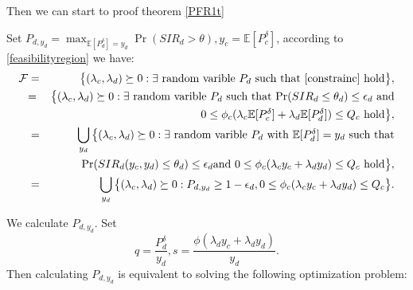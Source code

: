 \documentclass[12pt, draftclsnofoot, journal, letterpaper, onecolumn]{IEEEtran}
\begin{document}
Then we can start to proof theorem \ref{PFR1t}
\begin{IEEEproof}
Set $P_{d,y_d}=\max_{\mathbb{E}[P_d^\delta]=y_d}\Pr(SIR_d>\theta),y_c=\mathbb{E}[P_c^\delta]$, according to \eqref{feasibilityregion} we have:
\begin{eqnarray*}
\mathcal{F}&=&\big\{(\lambda_c,\lambda_d)\succeq0:\mbox{$\exists$ random varible $P_d$ such that \eqref{constrainc} hold}\big\},\\
&{=} & \big\{(\lambda_c,\lambda_d)\succeq0:\mbox{$\exists$ random varible $P_d$ such that $\Pr(SIR_d\leq\theta_d) \leq \epsilon_d$ and} \\ &&\mbox{$0\leq\phi_c(\lambda_c\mathbb{E}[P_c^{\delta}]+\lambda_d\mathbb{E}[P_d^{\delta}])\leq Q_c$ hold}\big\},\\
&=&\bigcup_{y_d}\big\{(\lambda_c,\lambda_d)\succeq0:\mbox{$\exists$ random varible $P_d$ with $\mathbb{E}[P_d^\delta]=y_d$ such that} \\&&\Pr(SIR_d(y_c,y_d)\leq\theta_d) \leq \epsilon_d \mbox{and $0\leq\phi_c(\lambda_cy_c+\lambda_dy_d)\leq Q_c$ hold}\big\},\\
&=&\bigcup_{y_d}\big\{(\lambda_c,\lambda_d)\succeq0:P_{d,y_d}\geq1-\epsilon_d,0\leq\phi_c(\lambda_cy_c+\lambda_dy_d)\leq Q_c\big\}.
\end{eqnarray*}



We calculate $P_{d,y_d}$. Set
\begin{equation*}
q=\frac{P_d^\delta}{y_d},s=\frac{\phi(\lambda_dy_c+\lambda_dy_d)}{y_d}.
\end{equation*}
Then calculating $P_{d,y_d}$ is equivalent to solving the following optimization problem:


\end{IEEEproof}
\end{document}
